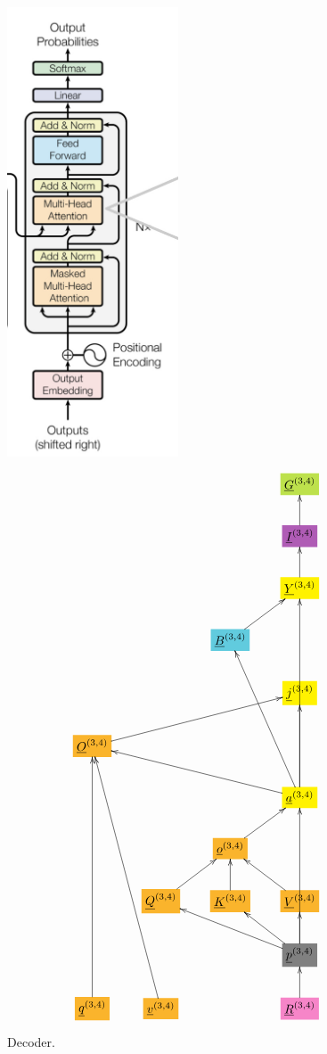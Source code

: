 \documentclass[12pt]{article}
\begin{document}
\begin{figure}[h!]\centering
\begin{minipage}{.5\linewidth}
\includegraphics[width=2in]{decoder.jpg}
\end{minipage}%
\begin{minipage}{.5\linewidth}
$$\xymatrix{
&&&*+[F*:SpringGreen]{\underline{G}^{(3, 4)}}
\\
&&&*+[F*:Orchid]{\underline{I}^{(3, 4)}}\ar[u]
\\
&&&*+[F*:yellow]{\underline{Y}^{(3, 4)}}\ar[u]
\\
&&*+[F*:SkyBlue]{\underline{B}^{(3, 4)}}\ar[ur]&
\\
&&&*+[F*:yellow]{\underline{j}^{(3, 4)}}
\\
*+[F*:Dandelion]{\underline{O}^{(3, 4)}}\ar[urrr]&&&
\\
&&&*+[F*:yellow]{\underline{a}^{(3, 4)}}\ar[uuuu]\ar[uuul]\ar[uu]\ar[ulll]
\\
&&*+[F*:Dandelion]{\underline{o}^{(3, 4)}}\ar[ur]&
\\
&*+[F*:Dandelion]{\underline{Q}^{(3, 4)}}\ar[ur]&*+[F*:Dandelion]{\underline{K}^{(3, 4)}}\ar[u]&*+[F*:Dandelion]{\underline{V}^{(3, 4)}}\ar[ul]
\\
&&&*+[F*:gray]{\underline{p}^{(3, 4)}}\ar[uuu]\ar[ull]\ar[ul]\ar[u]
\\
*+[F*:Dandelion]{\underline{q}^{(3, 4)}}\ar[uuuuu]&*+[F*:Dandelion]{\underline{v}^{(3, 4)}}\ar[uuuuul]&&*+[F*:Lavender]{\underline{R}^{(3, 4)}}\ar[u]
}$$
\end{minipage}
\caption{Decoder.}
\label{fig-texnn-for-decoder}
\end{figure}
\end{document}
